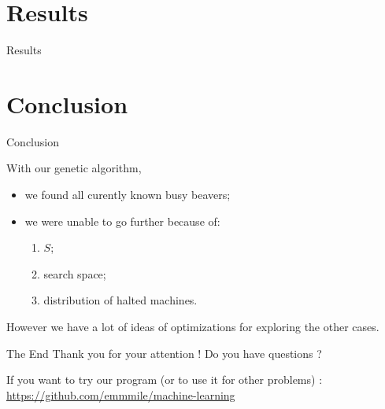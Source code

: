 \documentclass{beamer}
\begin{document}
\section{Results}

\begin{frame}{Results}


\end{frame}

\section{Conclusion}

\begin{frame}{Conclusion}

  With our genetic algorithm,
  \begin{itemize}
  \item we found all curently known busy beavers;
  \item we were unable to go further because of:
    \begin{enumerate}
    \item $S$;
    \item search space;
    \item distribution of halted machines.
    \end{enumerate}
  \end{itemize}

  \vspace{1cm} %
  However we have a lot of ideas of optimizations for exploring the other cases.
\end{frame}

\begin{frame}{The End}
  Thank you for your attention !
  Do you have questions ?

  \vspace{2cm} %

  If you want to try our program (or to use it for other problems) :
  \url{https://github.com/emmmile/machine-learning}
\end{frame}
\end{document}
